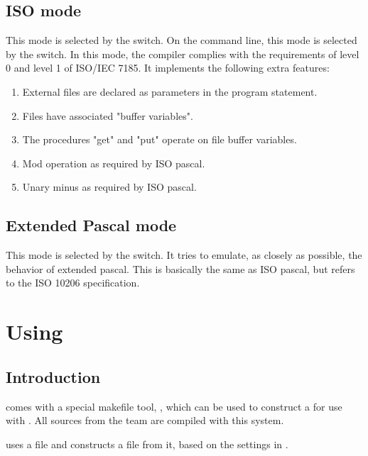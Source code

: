 \section{ISO mode}
This mode is selected by the  switch. On the
command line, this mode is selected by the  switch. In 
this mode, the compiler complies with the requirements of level 0 and 
level 1 of ISO/IEC 7185. It implements the following extra features:
\begin{enumerate}
\item External files are declared as parameters in the program 
statement.
\item Files have associated "buffer variables".
\item The procedures "get" and "put" operate on file buffer variables.
\item Mod operation as required by ISO pascal.
\item Unary minus as required by ISO pascal.
\end{enumerate}

\section{Extended Pascal mode}
This mode is selected by the  switch. It tries to emulate,
as closely as possible, the behavior of extended pascal. This is basically
the same as ISO pascal, but refers to the ISO 10206 specification.




\chapter{Using }
\label{ch:makefile}
\newcommand{\mvar}[1]{\var{\$(#1)}}
\newcommand{\fpcmake}{\file{fpcmake}}
\section{Introduction}
\fpc comes with a special makefile tool, \fpcmake{}, which can be
used to construct a  for use with \gnu {}.
All sources from the \fpc team are compiled with this system.

\fpcmake{} uses a file  and constructs a file
 from it, based on the settings in .

